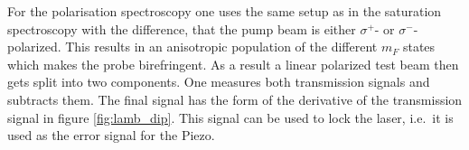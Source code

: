 For the polarisation spectroscopy one uses the same setup as in the saturation spectroscopy with the difference, that the pump beam is either $\sigma^+$- or $\sigma^-$-polarized. This results in an anisotropic population of the different $m_F$ states which makes the probe birefringent. As a result a linear polarized test beam then gets split into two components. One measures both transmission signals and subtracts them. The final signal has the form of the derivative of the transmission signal in figure \ref{fig:lamb_dip}. This signal can be used to lock the laser, i.e.\ it is used as the error signal for the Piezo.
